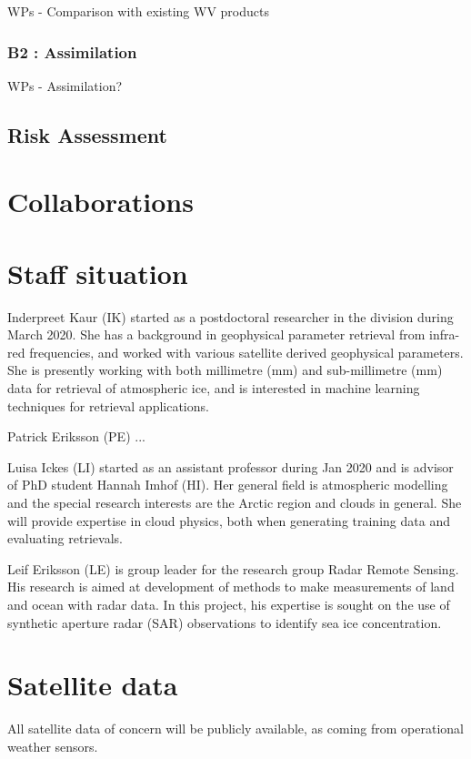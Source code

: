 \documentclass[12pt,oneside,a4paper]{article}
\begin{document}
WPs  - Comparison with existing WV products


\subsubsection*{B2 : Assimilation}

WPs  - Assimilation?

\subsection{Risk Assessment}

\section{Collaborations}

\section{Staff situation}
\label{sec:staff}
%
Inderpreet Kaur (IK) started as a postdoctoral researcher in the division during March 2020. She has a background in geophysical parameter retrieval from infra-red frequencies, and worked with various satellite derived geophysical parameters. She is presently working with both millimetre (mm) and sub-millimetre (mm) data for retrieval of atmospheric ice, and is interested in machine learning techniques for retrieval applications. 

Patrick Eriksson (PE) ...

Luisa Ickes (LI) started as an assistant professor during Jan 2020 and is advisor of PhD student Hannah Imhof (HI). Her general field is atmospheric modelling and the special research interests are the Arctic region and clouds in general. She will provide expertise in cloud physics, both when generating training data and evaluating retrievals.

Leif Eriksson (LE) is group leader for the research group Radar Remote Sensing. His research is aimed at development of methods to make measurements of land and ocean with radar data. In this project, his expertise is sought on the use of synthetic aperture radar (SAR) observations to identify sea ice concentration.

\section{Satellite data}
%
All satellite data of concern will be publicly available, as coming from
operational weather sensors.

{\footnotesize
	
}
\end{document}
